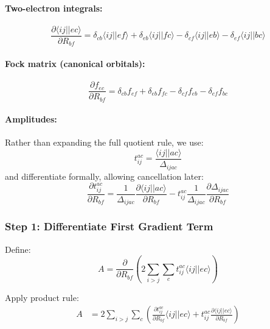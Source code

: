 \paragraph{Two-electron integrals:}
\begin{equation}
\frac{\partial \langle ij||ec\rangle}{\partial R_{bf}} =
\delta_{cb}\langle ij||ef\rangle
+ \delta_{eb}\langle ij||fc\rangle
- \delta_{cf}\langle ij||eb\rangle
- \delta_{ef}\langle ij||bc\rangle
\end{equation}

\paragraph{Fock matrix (canonical orbitals):}
\begin{equation}
\frac{\partial f_{ec}}{\partial R_{bf}} =
\delta_{cb}f_{ef}
+ \delta_{eb}f_{fc}
- \delta_{cf}f_{eb}
- \delta_{ef}f_{bc}
\end{equation}

\paragraph{Amplitudes:}

Rather than expanding the full quotient rule, we use:
\begin{equation}
t_{ij}^{ac} = \frac{\langle ij||ac\rangle}{\Delta_{ijac}}
\end{equation}
and differentiate formally, allowing cancellation later:
\begin{equation}
\frac{\partial t_{ij}^{ac}}{\partial R_{bf}} =
\frac{1}{\Delta_{ijac}} \frac{\partial \langle ij||ac\rangle}{\partial R_{bf}}
- t_{ij}^{ac} \frac{1}{\Delta_{ijac}} \frac{\partial \Delta_{ijac}}{\partial R_{bf}}
\end{equation}

\subsubsection{Step 1: Differentiate First Gradient Term}

Define:
\begin{equation}
A = \frac{\partial}{\partial R_{bf}}
\left(2\sum_{i>j}\sum_c t_{ij}^{ac}\langle ij||ec\rangle\right)
\end{equation}

Apply product rule:
\begin{align}
A &= 2\sum_{i>j}\sum_c
\left(
\frac{\partial t_{ij}^{ac}}{\partial R_{bf}}\langle ij||ec\rangle
+
t_{ij}^{ac}\frac{\partial \langle ij||ec\rangle}{\partial R_{bf}}
\right)
\end{align}

